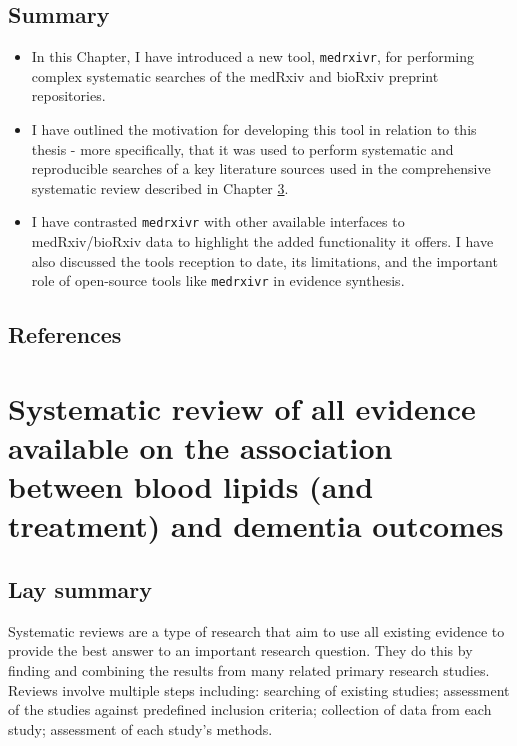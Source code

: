 \documentclass[a4paper, twoside]{templates/ociamthesis}
\begin{document}
\hypertarget{summary-1}{%
\section{Summary}\label{summary-1}}

\begin{itemize}
\item
  In this Chapter, I have introduced a new tool, \texttt{medrxivr}, for performing complex systematic searches of the medRxiv and bioRxiv preprint repositories.
\item
  I have outlined the motivation for developing this tool in relation to this thesis - more specifically, that it was used to perform systematic and reproducible searches of a key literature sources used in the comprehensive systematic review described in Chapter \ref{sys-rev-heading}.
\item
  I have contrasted \texttt{medrxivr} with other available interfaces to medRxiv/bioRxiv data to highlight the added functionality it offers. I have also discussed the tools reception to date, its limitations, and the important role of open-source tools like \texttt{medrxivr} in evidence synthesis.
\end{itemize}

\newpage

\hypertarget{references-1}{%
\section{References}\label{references-1}}



\hypertarget{sys-rev-heading}{%
\chapter{Systematic review of all evidence available on the association between blood lipids (and treatment) and dementia outcomes}\label{sys-rev-heading}}

\minitoc 

\hypertarget{lay-summary-2}{%
\section{Lay summary}\label{lay-summary-2}}

Systematic reviews are a type of research that aim to use all existing evidence to provide the best answer to an important research question. They do this by finding and combining the results from many related primary research studies. Reviews involve multiple steps including: searching of existing studies; assessment of the studies against predefined inclusion criteria; collection of data from each study; assessment of each study's methods.
\end{document}
